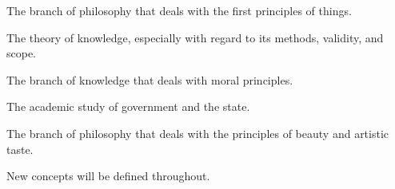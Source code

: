         \begin{definition}[Metaphysics]
        \label{def:metaphysics}
            The branch of philosophy that deals with the first principles of things.
        \end{definition}

        \begin{definition}[Epistemoly]
        \label{def:epistemology}
            The theory of knowledge, especially with regard to its methods, validity, and scope.
        \end{definition}

        \begin{definition}[Ethics]
        \label{def:ethics}
            The branch of knowledge that deals with moral principles.
        \end{definition}

        \begin{definition}[Politics]
        \label{def:politics}
            The academic study of government and the state.
        \end{definition}

        \begin{definition}[Aesthetics]
        \label{def:aesthetics}
            The branch of philosophy that deals with the principles of beauty and artistic taste.
        \end{definition}

    New concepts will be defined throughout.